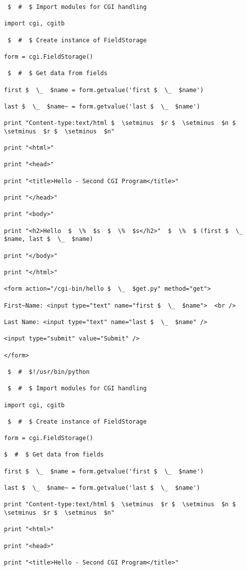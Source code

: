\begin {enumerate}
\begin {enumerate}
\begin{verbatim}
 $  #  $ Import modules for CGI handling

import cgi, cgitb

 $  #  $ Create instance of FieldStorage

form = cgi.FieldStorage()

 $  #  $ Get data from fields

first $  \_  $name = form.getvalue('first $  \_  $name')

last $  \_  $name~ = form.getvalue('last $  \_  $name')

print "Content-type:text/html $  \setminus  $r $  \setminus  $n $  \setminus  $r $  \setminus  $n"

print "<html>"

print "<head>"

print "<title>Hello - Second CGI Program</title>"

print "</head>"

print "<body>"

print "<h2>Hello  $  \%  $s  $  \%  $s</h2>"  $  \%  $ (first $  \_  $name, last $  \_  $name)

print "</body>"

print "</html>"

<form action="/cgi-bin/hello $  \_  $get.py" method="get">

First~Name: <input type="text" name="first $  \_  $name">  <br />

Last Name: <input type="text" name="last $  \_  $name" />

<input type="submit" value="Submit" />

</form>

 $  #  $!/usr/bin/python

 $  #  $ Import modules for CGI handling

import cgi, cgitb

 $  #  $ Create instance of FieldStorage

form = cgi.FieldStorage()

$  #  $ Get data from fields

first $  \_  $name = form.getvalue('first $  \_  $name')

last $  \_  $name~ = form.getvalue('last $  \_  $name')

print "Content-type:text/html $  \setminus  $r $  \setminus  $n $  \setminus  $r $  \setminus  $n"

print "<html>"

print "<head>"

print "<title>Hello - Second CGI Program</title>"


\end{verbatim}
\end{enumerate}
\end{enumerate}
